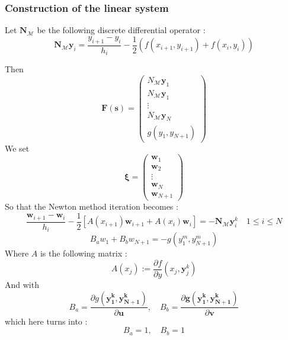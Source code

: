 \documentclass[11pt,a4paper,twocolumn]{article}
\begin{document}
\subsubsection{Construction of the linear system}

Let $\textbf{N}_{\mathcal{M}}$ be the following discrete differential operator : 
\[ \textbf{N}_{\mathcal{M}} \textbf{y}_i = \frac{y_{i+1}-y_{i}}{h_{i}}-\frac{1}{2}\left(f\left(x_{i+1}, y_{i+1}\right)+f\left(x_{i}, y_{i}\right)\right) \]

Then \[ \textbf{F}(\textbf{s}) = \begin{pmatrix}
N_{\mathcal{M}}\textbf{y}_1 \\
N_{\mathcal{M}}\textbf{y}_1 \\
\vdots \\
N_{\mathcal{M}}\textbf{y}_N \\
g(y_1, y_{N+1})
\end{pmatrix}
 \] 
We set
\[  \boldsymbol{\xi} = \begin{pmatrix}
\textbf{w}_1 \\
\textbf{w}_2 \\
\vdots \\
\textbf{w}_N \\
\textbf{w}_{N+1}
\end{pmatrix}
\]
So that the Newton method iteration becomes : 
\begin{equation}
\frac{\mathbf{w}_{i+1}-\mathbf{w}_{i}}{h_{i}}-\frac{1}{2}\left[A\left(x_{i+1}\right) \mathbf{w}_{i+1}+A\left(x_{i}\right) \mathbf{w}_{i}\right]=-\mathbf{N}_{\mathcal{M}} \mathbf{y}_{i}^{k	} \quad 1 \leq i \leq N
\end{equation}
\begin{equation}
B_{a} w_{1}+B_{b} w_{N+1}=-g\left(y_{1}^{m}, y_{N+1}^{m}\right)
\end{equation}
Where $A$ is the following matrix : 
$$
A\left(x_{j}\right):=\frac{\partial f}{\partial y}\left(x_{j},{\mathbf{y}}_{j}^{k}\right)
$$
And with $$
B_{a}=\frac{\partial g(\mathbf{y_1^k}, \mathbf{y_{N+1}^k})}{\partial \mathbf{u}}, \quad B_{b}=\frac{\partial \mathbf{g}(\mathbf{y_1^k}, \mathbf{y_{N+1}^k})}{\partial \mathbf{v}}
$$
which here turns into : 
$$
B_{a}=1, \quad B_{b}=1	
$$
\end{document}
